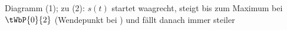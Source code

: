 Diagramm (1); zu (2): $s(t)$ startet waagrecht, steigt bis zum Maximum bei $\tWbP{0}{2}$ (Wendepunkt bei \tWaO) und fällt danach immer steiler
